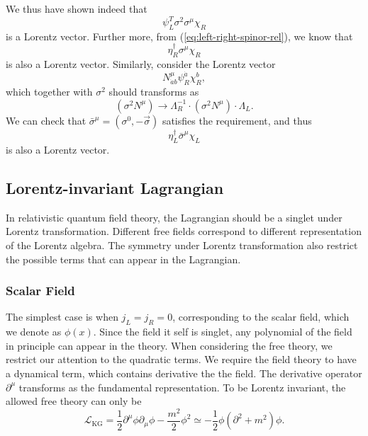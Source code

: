 We thus have shown indeed that
\begin{equation}
	\psi_L^T \sigma^2 \sigma^\mu \chi_R
\end{equation}
is a Lorentz vector.
Further more, from (\ref{eq:left-right-spinor-rel}), we know that
\begin{equation}
	\eta_R^\dagger \sigma^\mu \chi_R
\end{equation}
is also a Lorentz vector.
Similarly, consider the Lorentz vector 
\begin{equation*}
	N^\mu_{\dot a b} \psi^{\dot a}_R \chi^{b}_R,
\end{equation*}
which together with $\sigma^2$ should transforms as
\begin{equation*}
	\left(\sigma^2 N^\mu\right) \longrightarrow 
	\Lambda_R^{-1} \cdot \left(\sigma^2 N^\mu\right)\cdot \Lambda_L.
\end{equation*}
We can check that $\bar\sigma^\mu = (\sigma^0,-\vec\sigma)$ satisfies the requirement, and thus 
\begin{equation}
	\eta_L^\dagger \bar\sigma^\mu \chi_L
\end{equation}
is also a Lorentz vector.



\subsection{Lorentz-invariant Lagrangian}
In relativistic quantum field theory, the Lagrangian should be a singlet under Lorentz transformation.
Different free fields correspond to different representation of the Lorentz algebra.
The symmetry under Lorentz transformation also restrict the possible terms that can appear in the Lagrangian.

\subsubsection{Scalar Field}
The simplest case is when $j_L=j_R = 0$, corresponding to the scalar field, which we denote as $\phi(x)$.
Since the field it self is singlet, any polynomial of the field in principle can appear in the theory.
When considering the free theory, we restrict our attention to the quadratic terms.
We require the field theory to have a dynamical term, which contains derivative the the field.
The derivative operator $\partial^\mu$ transforms as the fundamental representation.
To be Lorentz invariant, the allowed free theory can only be
\begin{equation}
	\mathcal L_{\mathrm{KG}} = \frac{1}{2}\partial^\mu \phi \partial_\mu \phi -\frac{m^2}{2}\phi^2 
	\simeq -\frac{1}{2}\phi (\partial^2+m^2) \phi.
\end{equation}

